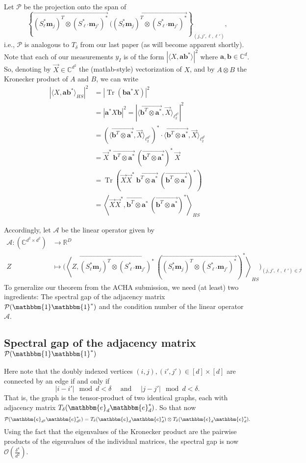 \documentclass[]{spie}  %
\def \vec{\overrightarrow}
\def \a {\mathbf a}
\def \b {\mathbf b}
\def \m {\mathbf m}
\def \P { \mathcal{P}}
\def \e { \mathbbm{e}}
\def \jj {{j'}}
\def \elll {{\ell'}}
\DeclareMathOperator{\Tr}{Tr}
\begin{document}
Let $\P$ be the projection onto the span of %
$$\left\{\vec{(S_\ell^*\m_j)^T \otimes (S_\elll^*\m_\jj)^*} \ (\vec{(S_\ell^*\m_j)^T \otimes (S_\elll^*\m_\jj)^*}\right\}_{(j,j',\ell,\ell')},$$
i.e., $\P$ is analogous to $T_\delta$ from our last paper (as will become apparent shortly).
Note that each of our measurements $y_I$ is of the form $|\langle X , \a\b^* \rangle|^2$ where $\a,\b \in \mathbb{C}^d$. So, denoting by $\vec{X} \in \mathbb{C}^{d^2}$ the (matlab-style) vectorization of $X$, and by $A\otimes B$ the Kronecker product of $A$ and $B$, we can write
\begin{align}
|\langle X , \a\b^* \rangle_{HS}|^2 &= |\Tr{(\b\a^* X)} |^2 
\nonumber\\& =|\a^* X \b |^2 = |\langle\vec{\b^T \otimes \a^*}, \vec{X} \rangle_{\ell_2^{d^2}}|^2
\nonumber\\& =\left(\langle\vec{\b^T \otimes \a^*}, \vec{X} \rangle_{\ell_2^{d^2}}\right) ^* \cdot \langle\vec{\b^T \otimes \a^*}, \vec{X} \rangle_{\ell_2^{d^2}}
\nonumber\\& = \vec{X}^* \ \vec{\b^T \otimes \a^*} \ (\vec{\b^T \otimes \a^*})^* \ \vec{X}
\nonumber\\&= \Tr\left( \vec{X}\vec{X}^* \ \vec{\b^T \otimes \a^*} \ (\vec{\b^T \otimes \a^*})^* \right)
\nonumber\\&= \left\langle \vec{X}\vec{X}^* , \vec{\b^T \otimes \a^*} \ (\vec{\b^T \otimes \a^*})^* \right\rangle_{HS}
\label{eq:exp1}\end{align}

Accordingly, let $\mathcal{A}$ be the linear operator given by \begin{align}\mathcal{A}:  %
(\mathbb{C}^{d^2 \times d^2}) &\to \mathbb{R}^D 
\nonumber\\  Z&\mapsto  \Bigg(\left\langle Z , \vec{(S_\ell^*\m_j)^T \otimes (S_\elll^*\m_\jj)^*} \ (\vec{(S_\ell^*\m_j)^T \otimes (S_\elll^*\m_\jj)^*})^* \right\rangle_{HS}  \Bigg)_{(j,\jj,\ell,\elll) \in \mathcal{I}}\label{eq:exp2}
 \end{align}
To generalize our theorem from the ACHA submission, we need  (at least) two ingredients: 
The spectral gap of the adjacency matrix $\P(\mathbbm{1}\mathbbm{1}^*)$ and the condition number of the linear operator $\mathcal{A}$.
\subsection{Spectral gap of the adjacency matrix $\P(\mathbbm{1}\mathbbm{1}^*)$} Here note that the doubly indexed vertices $(i,j),(i',j') \in [d]\times[d]$ are connected by an edge if and only if 
$$|i-i'| \mod d < \delta \quad \text{ and } \quad |j-j'| \mod d < \delta.$$ 
That is, the graph is the tensor-product of two identical graphs, each with adjacency matrix $T_\delta(\e_d\e_d^*)$.
So that now $$\P(\e_{d^2}\e_{d^2}^*) = T_\delta(\e_d\e_d^*) \otimes T_\delta(\e_d\e_d^*).$$
Using the fact that the eigenvalues of the Kronecker product are the pairwise products of the eigenvalues of the individual matrices,  the spectral gap is now $\mathcal{O}(  \frac{\delta^4}{d^2}  ).$
\smallskip
\end{document}
